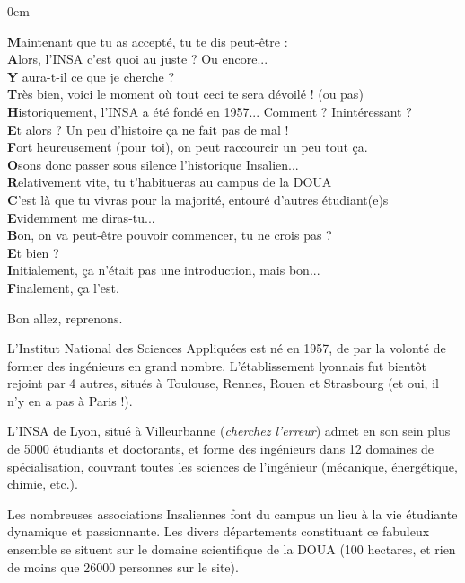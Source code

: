\vspace{1em}
{
    \footnotesize
    \parindent 0em
    \begin{changemargin}{-1cm}{0cm}
\textbf{M}aintenant que tu as accepté, tu te dis peut-être :\\
\textbf{A}lors, l'INSA c'est quoi au juste ? Ou encore...\\
\textbf{Y} aura-t-il ce que je cherche ?\\

\textbf{T}rès bien, voici le moment où tout ceci te sera dévoilé ! (ou pas)\\
\textbf{H}istoriquement, l'INSA a été fondé en 1957... Comment ? Inintéressant ?\\
\textbf{E}t alors ? Un peu d'histoire ça ne fait pas de mal !\\

\textbf{F}ort heureusement (pour toi), on peut raccourcir un peu tout ça.\\
\textbf{O}sons donc passer sous silence l'historique Insalien...\\
\textbf{R}elativement vite, tu t'habitueras au campus de la DOUA\\
\textbf{C}'est là que tu vivras pour la majorité, entouré d'autres étudiant(e)s\\
\textbf{E}videmment me diras-tu...\\

\textbf{B}on, on va peut-être pouvoir commencer, tu ne crois pas ?\\
\textbf{E}t bien ?\\

\textbf{I}nitialement, ça n'était pas une introduction, mais bon...\\
\textbf{F}inalement, ça l'est.\\
\end{changemargin}
} %

Bon allez, reprenons.

\vspace{1em}

L'Institut National des Sciences Appliquées est né en 1957, de par la volonté de
former des ingénieurs en grand nombre. L'établissement lyonnais fut bientôt 
rejoint par 4 autres, situés à Toulouse, Rennes, Rouen
et Strasbourg (et oui, il n'y en a pas à Paris !).

\vspace{1em}

L'INSA de Lyon, situé à Villeurbanne (\emph{cherchez l'erreur}) admet en son sein plus
de 5000 étudiants et doctorants, et forme des ingénieurs dans 12 domaines de
spécialisation, couvrant toutes les sciences de l'ingénieur (mécanique,
énergétique, chimie, etc.).

\vspace{1em}

Les nombreuses associations Insaliennes font du campus un lieu à la vie
étudiante dynamique et passionnante. Les divers départements constituant
ce fabuleux ensemble se situent sur le domaine scientifique de la DOUA (100 
hectares, et rien de moins que 26000 personnes sur le site).
